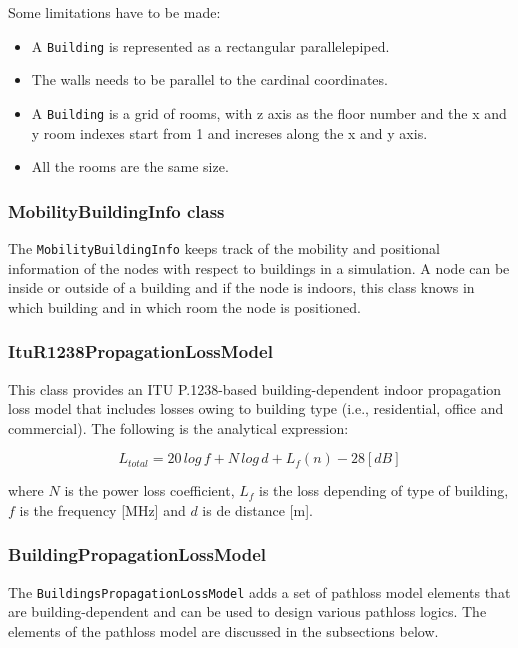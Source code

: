 Some limitations have to be made:
\begin{itemize}[topsep=0pt]
  \item A \texttt{Building} is represented as a rectangular parallelepiped.
  \item The walls needs to be parallel to the cardinal coordinates.
  \item A \texttt{Building} is a grid of rooms, with z axis as the floor number and the x and y room
  indexes start from 1 and increses along the x and y axis.
  \item All the rooms are the same size.
\end{itemize}

\subsubsection{MobilityBuildingInfo class}

The \texttt{MobilityBuildingInfo} keeps track of the mobility and positional information of 
the nodes with respect to buildings in a simulation. A node can be inside or outside of
a building and if the node is indoors, this class knows in which building and in which room
the node is positioned.

\subsubsection{ItuR1238PropagationLossModel}

This class provides an ITU P.1238-based building-dependent indoor propagation loss model 
that includes losses owing to building type (i.e., residential, office and commercial). 
The following is the analytical expression:

\begin{equation}
  L_{total} = 20\,log\,f + N\,log\,d + L_f (n) - 28[dB]
\end{equation}

where ${N}$ is the power loss coefficient, ${L_f}$ is the loss depending of type of building,
${f}$ is the frequency [MHz] and ${d}$ is de distance [m].

\subsubsection{BuildingPropagationLossModel}

The \texttt{BuildingsPropagationLossModel} adds a set of pathloss model elements that are 
building-dependent and can be used to design various pathloss logics. The elements of the 
pathloss model are discussed in the subsections below.

